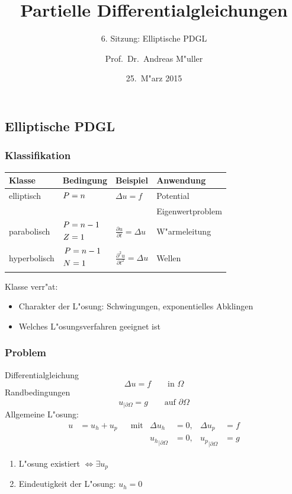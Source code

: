 \documentclass{beamer}
\title[]{Partielle Differentialgleichungen}
\subtitle{6. Sitzung: Elliptische PDGL}
\date[25.~M"arz 2015]{25.~M"arz 2015}
\author{Prof.~Dr.~Andreas M"uller}
\begin{document}
\begin{frame}
\section{Elliptische PDGL}
\titlepage
\end{frame}

\begin{frame}
\frametitle{Klassifikation}

\begin{center}
\begin{tabular}{llll}
Klasse&Bedingung&Beispiel&Anwendung\\
\hline
elliptisch &$\begin{aligned}P&=n\mathstrut\end{aligned}$
	&$\displaystyle \Delta u=f                                $
		&Potential\\
&	&	&Eigenwertproblem\\
\hline
parabolisch&%
$\begin{aligned}P&=n-1\mathstrut\\Z&=1\mathstrut\end{aligned}$
	&$\displaystyle \frac{\partial u}{\partial t}=\Delta u    $
		&W"armeleitung\\
\hline
hyperbolisch&%
$\begin{aligned}P&=n-1\mathstrut\\N&=1\mathstrut\end{aligned}$
	&$\displaystyle \frac{\partial^2 u}{\partial t^2}=\Delta u$
		&Wellen\\
\hline
\end{tabular}
\end{center}

Klasse verr"at:
\begin{itemize}
\item Charakter der L"osung: Schwingungen, exponentielles Abklingen
\item Welches L"osungsverfahren geeignet ist
\end{itemize}

\end{frame}

\begin{frame}
\frametitle{Problem}
Differentialgleichung
\[
\Delta u=f\qquad\text{in $\Omega$}
\]
Randbedingungen
\[
u_{|\partial \Omega}=g\qquad\text{auf $\partial\Omega$}
\]
\pause
Allgemeine L"osung:
\begin{align*}
u&=u_h+u_p&&\text{mit}&             \Delta u_h&=0,&             \Delta u_p&=f\\
 &        &&          &{u_h}_{|\partial\Omega}&=0,&{u_p}_{|\partial\Omega}&=g
\end{align*}
\begin{enumerate}
\item L"osung existiert $\Leftrightarrow \exists u_p$  
\item Eindeutigkeit der L"osung: $u_h=0$
\end{enumerate}
\end{frame}
\end{document}
